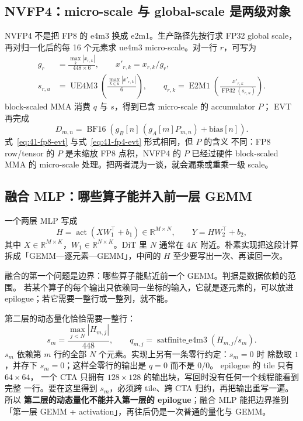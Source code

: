 \subsection{NVFP4：micro-scale 与 global-scale 是两级对象}

NVFP4 不是把 FP8 的 e4m3 换成 e2m1。生产路径先按行求 FP32 global scale，
再对归一化后的每 16 个元素求 ue4m3 micro-scale。对一行 $r$，可写为
\begin{align}
  g_r &= \frac{\max_k|x_{r,k}|}{448\times6},\qquad x'_{r,k}=x_{r,k}/g_r,\\
  s_{r,u} &= \operatorname{UE4M3}\!\left(
    \frac{\max_{k\in u}|x'_{r,k}|}{6}\right),\qquad
  q_{r,k}=\operatorname{E2M1}\!\left(
    \frac{x'_{r,k}}{\operatorname{FP32}(s_{r,u})}\right).
  \label{eq:41-fp4-quant}
\end{align}
block-scaled MMA 消费 $q$ 与 $s$，得到已含 micro-scale 的 accumulator $P$；
EVT 再完成
\begin{equation}
  D_{m,n}=\operatorname{BF16}\!\left(
    g_B[n]\,(g_A[m]P_{m,n})+\mathrm{bias}[n]\right).
  \label{eq:41-fp4-evt}
\end{equation}
式~\ref{eq:41-fp8-evt} 与式~\ref{eq:41-fp4-evt} 形式相同，但 $P$ 的含义
不同：FP8 row/tensor 的 $P$ 是未缩放 FP8 点积，NVFP4 的 $P$ 已经过硬件
block-scaled MMA 的 micro-scale 处理。把两者混为一谈，就会漏乘或重乘一级
scale。

\subsection{融合 MLP：哪些算子能并入前一层 GEMM}

一个两层 MLP 写成
\begin{equation}
  H=\operatorname{act}\!\left(XW_1^{\top}+b_1\right)\in\mathbb R^{M\times N},
  \qquad
  Y=HW_2^{\top}+b_2,
  \label{eq:41-mlp}
\end{equation}
其中 $X\in\mathbb R^{M\times K}$，$W_1\in\mathbb R^{N\times K}$。DiT 里
$N$ 通常在 $4K$ 附近。朴素实现把这段计算拆成「GEMM—逐元素—GEMM」，中间的
$H$ 至少要写出一次、再读回一次。

融合的第一个问题是边界：哪些算子能贴近前一个 GEMM。判据是数据依赖的范围。
若某个算子的每个输出只依赖同一坐标的输入，它就是逐元素的，可以放进
epilogue；若它需要一整行或一整列，就不能。

第二层的动态量化恰恰需要一整行：
\begin{equation}
  s_m=\frac{\max_{j<N}|H_{m,j}|}{448},\qquad
  q_{m,j}=\operatorname{satfinite\_e4m3}\!\left(H_{m,j}/s_m\right).
  \label{eq:41-mlp-quant}
\end{equation}
$s_m$ 依赖第 $m$ 行的全部 $N$ 个元素。实现上另有一条零行约定：$s_m=0$ 时
除数取 $1$，并存下 $s_m=0$；这样全零行的输出是 $q=0$ 而不是 $0/0$。
epilogue 的 tile 只有 $64\times64$，
一个 CTA 只拥有 $128\times128$ 的输出块，写回时没有任何一个线程能看到完整
一行。要在这里得到 $s_m$，必须跨 tile、跨 CTA 归约，再把输出重写一遍。所以
\textbf{第二层的动态量化不能并入第一层的 epilogue}；融合 MLP 能把边界推到
「第一层 GEMM + activation」，再往后仍是一次普通的量化与 GEMM。

